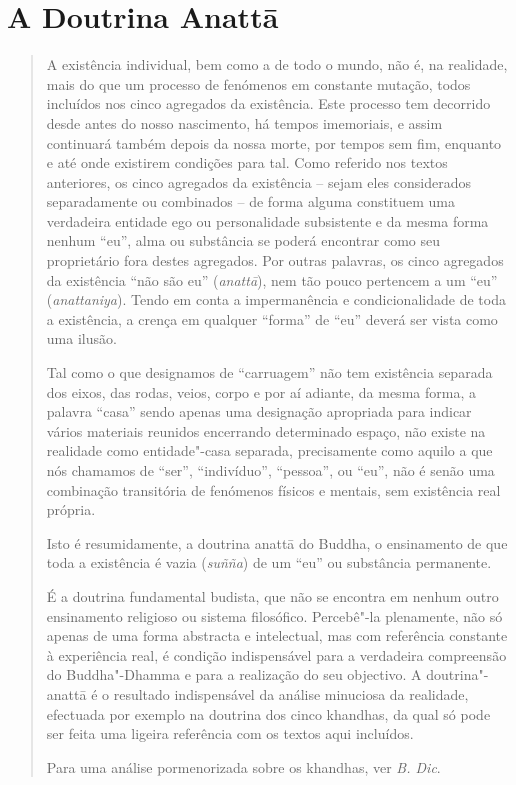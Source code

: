
\section{A Doutrina Anattā}

\begin{quote}
  A existência individual, bem como a de todo o mundo, não é, na realidade, mais
  do que um processo de fenómenos em constante mutação, todos incluídos nos
  cinco agregados da existência. Este processo tem decorrido desde antes do
  nosso nascimento, há tempos imemoriais, e assim continuará também depois da
  nossa morte, por tempos sem fim, enquanto e até onde existirem condições para
  tal. Como referido nos textos anteriores, os cinco agregados da existência --
  sejam eles considerados separadamente ou combinados -- de forma alguma
  constituem uma verdadeira entidade ego ou personalidade subsistente e da
  mesma forma nenhum “eu”, alma ou substância se poderá encontrar como seu
  proprietário fora destes agregados. Por outras palavras, os cinco agregados da
  existência “não são eu” (\emph{anattā}), nem tão pouco pertencem a um “eu”
  (\emph{anattaniya}). Tendo em conta a impermanência e condicionalidade de toda
  a existência, a crença em qualquer “forma” de “eu” deverá ser vista como
  uma ilusão.

  Tal como o que designamos de “carruagem” não tem existência separada dos
  eixos, das rodas, veios, corpo e por aí adiante, da mesma forma, a palavra
  “casa” sendo apenas uma designação apropriada para indicar vários
  materiais reunidos encerrando determinado espaço, não existe na realidade
  como entidade"-casa separada, precisamente como aquilo a que nós
  chamamos de “ser”, “indivíduo”, “pessoa”, ou “eu”, não é senão uma
  combinação transitória de fenómenos físicos e mentais, sem existência real
  própria.

  Isto é resumidamente, a doutrina anattā do Buddha, o ensinamento de que toda a
  existência é vazia (\emph{suñña}) de um “eu” ou substância permanente.

  É a doutrina fundamental budista, que não se encontra em nenhum outro
  ensinamento religioso ou sistema filosófico. Percebê"-la plenamente, não só
  apenas de uma forma abstracta e intelectual, mas com referência constante à
  experiência real, é condição indispensável para a verdadeira compreensão do
  Buddha"-Dhamma e para a realização do seu objectivo. A doutrina"-anattā é o
  resultado indispensável da análise minuciosa da realidade, efectuada por
  exemplo na doutrina dos cinco khandhas, da qual só pode ser feita uma ligeira
  referência com os textos aqui incluídos.

  Para uma análise pormenorizada sobre os khandhas, ver \emph{B. Dic}.
\end{quote}

